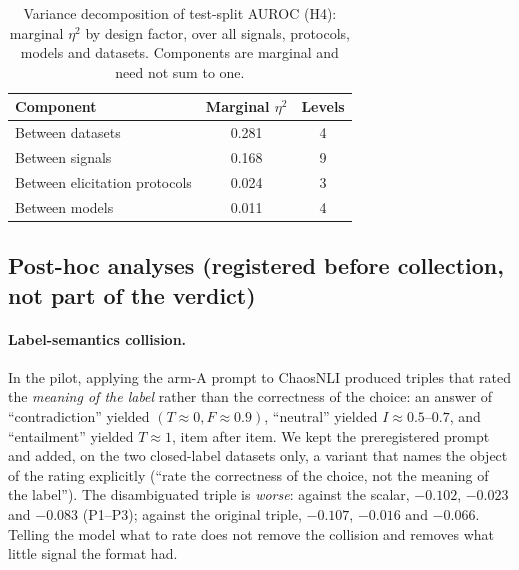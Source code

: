 \documentclass[11pt]{article}
\begin{document}
\begin{table}[t]
\centering
\caption{Variance decomposition of test-split AUROC (H4): marginal $\eta^2$ by design factor,
over all signals, protocols, models and datasets. Components are marginal and need not sum to one.}
\label{tab:variance}
\small
\begin{tabular}{lcc}
\toprule
Component & Marginal $\eta^2$ & Levels \\
\midrule
Between datasets              & 0.281 & 4 \\
Between signals               & 0.168 & 9 \\
Between elicitation protocols & 0.024 & 3 \\
Between models                & 0.011 & 4 \\
\bottomrule
\end{tabular}
\end{table}

\subsection{Post-hoc analyses (registered before collection, not part of the verdict)}
\label{sec:posthoc}

\paragraph{Label-semantics collision.} In the pilot, applying the arm-A prompt to ChaosNLI
produced triples that rated the \emph{meaning of the label} rather than the correctness of the
choice: an answer of ``contradiction'' yielded $(T\approx0, F\approx0.9)$, ``neutral'' yielded
$I\approx0.5$--$0.7$, and ``entailment'' yielded $T\approx1$, item after item. We kept the
preregistered prompt and added, on the two closed-label datasets only, a variant that names the
object of the rating explicitly (``rate the correctness of the choice, not the meaning of the
label''). The disambiguated triple is \emph{worse}: against the scalar, $-0.102$, $-0.023$ and
$-0.083$ (P1--P3); against the original triple, $-0.107$, $-0.016$ and $-0.066$. Telling the
model what to rate does not remove the collision and removes what little signal the format had.
\end{document}
